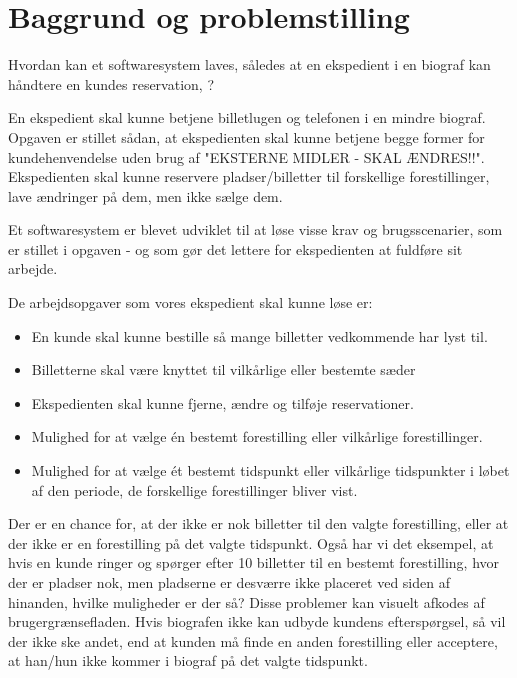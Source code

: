 \chapter{Baggrund og problemstilling}

Hvordan kan et softwaresystem laves, således at en ekspedient i en biograf kan håndtere en kundes reservation,  ?


En ekspedient skal kunne betjene billetlugen og telefonen i en mindre biograf. Opgaven er stillet sådan, at ekspedienten skal kunne betjene begge former for kundehenvendelse uden brug af "EKSTERNE MIDLER - SKAL ÆNDRES!!". Ekspedienten skal kunne reservere pladser/billetter til forskellige forestillinger, lave ændringer på dem, men ikke sælge dem.

Et softwaresystem er blevet udviklet til at løse visse krav og brugsscenarier, som er stillet i opgaven - og som gør det lettere for ekspedienten at fuldføre sit arbejde.

De arbejdsopgaver som vores ekspedient skal kunne løse er:

\begin{itemize}
  \item En kunde skal kunne bestille så mange billetter vedkommende har lyst til.
  \item Billetterne skal være knyttet til vilkårlige eller bestemte sæder
  \item Ekspedienten skal kunne fjerne, ændre og tilføje reservationer.
  \item Mulighed for at vælge én bestemt forestilling eller vilkårlige forestillinger.
  \item Mulighed for at vælge ét bestemt tidspunkt eller vilkårlige tidspunkter i løbet af den periode, de forskellige forestillinger bliver vist.
\end{itemize}

Der er en chance for, at der ikke er nok billetter til den valgte forestilling, eller at der ikke er en forestilling på det valgte tidspunkt. Også har vi det eksempel, at hvis en kunde ringer og spørger efter 10 billetter til en bestemt forestilling, hvor der er pladser nok, men pladserne er desværre ikke placeret ved siden af hinanden, hvilke muligheder er der så? Disse problemer kan visuelt afkodes af brugergrænsefladen. Hvis biografen ikke kan udbyde kundens efterspørgsel, så vil der ikke ske andet, end at kunden må finde en anden forestilling eller acceptere, at han/hun ikke kommer i biograf på det valgte tidspunkt.

